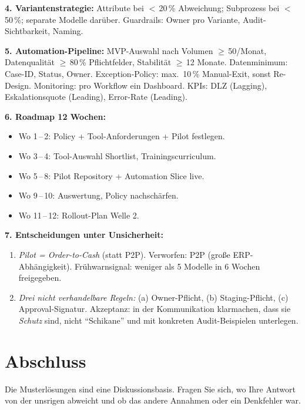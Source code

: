\documentclass[11pt,a4paper,oneside]{article}
\begin{document}
\begin{loesungbox}
\smallskip
\textbf{4. Variantenstrategie:} Attribute bei $<$\,20\,\% Abweichung; Subprozess bei $<$\,50\,\%; separate Modelle dar\"uber. Guardrails: Owner pro Variante, Audit-Sichtbarkeit, Naming.

\smallskip
\textbf{5. Automation-Pipeline:} MVP-Auswahl nach Volumen $\geq$\,50/Monat, Datenqualit\"at $\geq$\,80\,\% Pflichtfelder, Stabilit\"at $\geq$\,12 Monate. Datenminimum: Case-ID, Status, Owner. Exception-Policy: max.\ 10\,\% Manual-Exit, sonst Re-Design. Monitoring: pro Workflow ein Dashboard. KPIs: DLZ (Lagging), Eskalationsquote (Leading), Error-Rate (Leading).

\smallskip
\textbf{6. Roadmap 12 Wochen:}
\begin{itemize}
  \item Wo 1\,--\,2: Policy + Tool-Anforderungen + Pilot festlegen.
  \item Wo 3\,--\,4: Tool-Auswahl Shortlist, Trainingscurriculum.
  \item Wo 5\,--\,8: Pilot Repository + Automation Slice live.
  \item Wo 9\,--\,10: Auswertung, Policy nachsch\"arfen.
  \item Wo 11\,--\,12: Rollout-Plan Welle 2.
\end{itemize}

\smallskip
\textbf{7. Entscheidungen unter Unsicherheit:}
\begin{enumerate}
  \item \emph{Pilot = Order-to-Cash} (statt P2P). Verworfen: P2P (gro{\ss}e ERP-Abh\"angigkeit). Fr\"uhwarnsignal: weniger als 5 Modelle in 6 Wochen freigegeben.
  \item \emph{Drei nicht verhandelbare Regeln:} (a) Owner-Pflicht, (b) Staging-Pflicht, (c) Approval-Signatur. Akzeptanz: in der Kommunikation klarmachen, dass sie \emph{Schutz} sind, nicht ``Schikane'' \textendash{} und mit konkreten Audit-Beispielen unterlegen.
\end{enumerate}
\end{loesungbox}

\clearpage

\section*{Abschluss}
\thispagestyle{plain}

\noindent Die Musterl\"osungen sind eine Diskussionsbasis. Fragen Sie sich, wo Ihre Antwort von der unsrigen abweicht \textendash{} und ob das andere Annahmen oder ein Denkfehler war.
\end{document}
